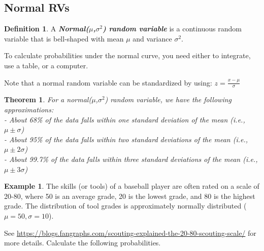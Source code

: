 \documentclass[
  11pt,
]{book}
\newtheorem{theorem}{Theorem}[chapter]
\theoremstyle{definition}
\newtheorem{definition}{Definition}[chapter]
\theoremstyle{definition}
\newtheorem{example}{Example}[chapter]
\theoremstyle{definition}
\theoremstyle{definition}
\theoremstyle{remark}
\begin{document}
\newpage

\hypertarget{normal-rvs}{%
\subsection{Normal RVs}\label{normal-rvs}}

\begin{definition}
A \textbf{\emph{Normal(\(\mu\),\(\sigma^2\)) random variable}} is a continuous random variable that is bell-shaped with mean \(\mu\) and variance \(\sigma^2\).

To calculate probabilities under the normal curve, you need either to integrate, use a table, or a computer.

Note that a normal random variable can be standardized by using: \(z = \frac{x-\mu}{\sigma}\)
\end{definition}

\begin{theorem}
For a normal(\(\mu\),\(\sigma^2\)) random variable, we have the following approximations:\\
- About 68\% of the data falls within one standard deviation of the mean (i.e., \(\mu \pm \sigma\))\\
- About 95\% of the data falls within two standard deviations of the mean (i.e., \(\mu \pm 2\sigma\))\\
- About 99.7\% of the data falls within three standard deviations of the mean (i.e., \(\mu \pm 3\sigma\))
\end{theorem}

\begin{example}
The skills (or tools) of a baseball player are often rated on a scale of 20-80, where 50 is an average grade, 20 is the lowest grade, and 80 is the highest grade. The distribution of tool grades is approximately normally distributed (\(\mu=50, \sigma =10\)).

See \url{https://blogs.fangraphs.com/scouting-explained-the-20-80-scouting-scale/} for more details. Calculate the following probabilities.
\end{example}
\end{document}
